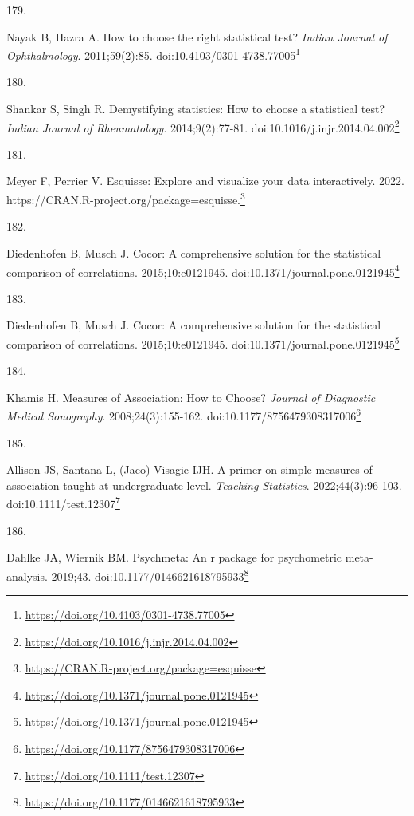 \documentclass[
  a4paper,
]{book}
\newlength{\cslhangindent}
\newlength{\csllabelwidth}
\newlength{\cslentryspacingunit} %
\newenvironment{CSLReferences}[2] %
 {%
  \setlength{\parindent}{0pt}
  \ifodd #1
  \let\oldpar\par
  \def\par{\hangindent=\cslhangindent\oldpar}
  \fi
  \setlength{\parskip}{#2\cslentryspacingunit}
 }%
 {}
\newcommand{\CSLLeftMargin}[1]{\parbox[t]{\csllabelwidth}{#1}}
\newcommand{\CSLRightInline}[1]{\parbox[t]{\linewidth - \csllabelwidth}{#1}\break}
\renewcommand{\href}[2]{#2\footnote{\url{#1}}}
\begin{document}
\begin{CSLReferences}{0}{0}
\leavevmode{}%
\CSLLeftMargin{179. }%
\CSLRightInline{Nayak B, Hazra A. How to choose the right statistical test? \emph{Indian Journal of Ophthalmology}. 2011;59(2):85. doi:\href{https://doi.org/10.4103/0301-4738.77005}{10.4103/0301-4738.77005}}

\leavevmode{}%
\CSLLeftMargin{180. }%
\CSLRightInline{Shankar S, Singh R. Demystifying statistics: How to choose a statistical test? \emph{Indian Journal of Rheumatology}. 2014;9(2):77-81. doi:\href{https://doi.org/10.1016/j.injr.2014.04.002}{10.1016/j.injr.2014.04.002}}

\leavevmode{}%
\CSLLeftMargin{181. }%
\CSLRightInline{Meyer F, Perrier V. Esquisse: Explore and visualize your data interactively. 2022. \href{https://CRAN.R-project.org/package=esquisse}{https://CRAN.R-project.org/package=esquisse.}}

\leavevmode{}%
\CSLLeftMargin{182. }%
\CSLRightInline{Diedenhofen B, Musch J. Cocor: A comprehensive solution for the statistical comparison of correlations. 2015;10:e0121945. doi:\href{https://doi.org/10.1371/journal.pone.0121945}{10.1371/journal.pone.0121945}}

\leavevmode{}%
\CSLLeftMargin{183. }%
\CSLRightInline{Diedenhofen B, Musch J. Cocor: A comprehensive solution for the statistical comparison of correlations. 2015;10:e0121945. doi:\href{https://doi.org/10.1371/journal.pone.0121945}{10.1371/journal.pone.0121945}}

\leavevmode{}%
\CSLLeftMargin{184. }%
\CSLRightInline{Khamis H. Measures of Association: How to Choose? \emph{Journal of Diagnostic Medical Sonography}. 2008;24(3):155-162. doi:\href{https://doi.org/10.1177/8756479308317006}{10.1177/8756479308317006}}

\leavevmode{}%
\CSLLeftMargin{185. }%
\CSLRightInline{Allison JS, Santana L, (Jaco) Visagie IJH. A primer on simple measures of association taught at undergraduate level. \emph{Teaching Statistics}. 2022;44(3):96-103. doi:\href{https://doi.org/10.1111/test.12307}{10.1111/test.12307}}

\leavevmode{}%
\CSLLeftMargin{186. }%
\CSLRightInline{Dahlke JA, Wiernik BM. {\textbraceleft}Psychmeta{\textbraceright}: An r package for psychometric meta-analysis. 2019;43. doi:\href{https://doi.org/10.1177/0146621618795933}{10.1177/0146621618795933}}


\end{CSLReferences}
\end{document}
